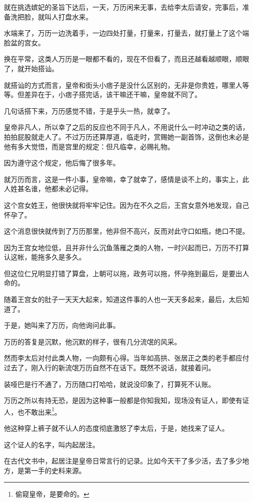 \begin{multicols}{\theparacolNo}
		就在挑选嫔妃的圣旨下达后，一天，万历闲来无事，去给李太后请安，完事后，准备洗把脸，就叫人打盘水来。

		水端来了，万历一边洗着手，一边四处打量，打量来，打量去，就打量上了这个端脸盆的宫女。

		换在平常，这类人万历是一眼都不看的，现在不但看了，而且还越看越顺眼，顺眼了，就开始搭讪。

		就搭讪的方式而言，皇帝和街头小痞子是没什么区别的，无非是你贵姓，哪里人等等。但差异在于，小痞子搭完话，该干嘛还干嘛，皇帝就不同了。

		几句话搭下来，万历感觉不错，于是乎头一热，就幸了。

		皇帝非凡人，所以幸了之后的反应也不同于凡人，不用说什么一时冲动之类的话，拍拍屁股就走人了。不过万历还算厚道，临走时，赏赐她一副首饰，这倒也未必是他有多大觉悟，而是宫里的规定：但凡临幸，必赐礼物。

		因为遵守这个规定，他后悔了很多年。

		就万历而言，这是一件小事，皇帝嘛，幸了就幸了，感情是谈不上的，事实上，此人姓甚名谁，他都未必记得。

		这个宫女姓王，他很快就将牢牢记住。因为在不久之后，王宫女意外地发现，自己怀孕了。

		这个消息很快就传到了万历那里，他非但不高兴，反而对此守口如瓶，绝口不提。

		因为王宫女地位低，且并非什么沉鱼落雁之类的人物，一时兴起而已，万历不打算认这帐，能拖多久是多久。

		但这位仁兄明显打错了算盘，上朝可以拖，政务可以拖，怀孕拖到最后，是要出人命的。

		随着王宫女的肚子一天天大起来，知道这件事的人也一天天多起来，最后，太后知道了。

		于是，她叫来了万历，向他询问此事。

		万历的答复是沉默，他沉默的样子，很有几分流氓的风采。

		然而李太后对付此类人物，一向颇有心得。当年如高拱、张居正之类的老手都应付过去了，刚入行的新流氓万历自然不在话下。既然不说话，就接着问。

		装哑巴是行不通了，万历随口打哈哈，就说没印象了，打算死不认账。

		万历之所以有持无恐，是因为这种事一般都是你知我知，现场没有证人，即使有证人，也不敢出来\footnote{偷窥皇帝，是要命的。}。

		他这种穿上裤子就不认人的态度彻底激怒了李太后，于是，她找来了证人。

		这个证人的名字，叫内起居注。

		在古代文书中，起居注是皇帝日常言行的记录。比如今天干了多少活，去了多少地方，是第一手的史料来源。


\end{multicols}
